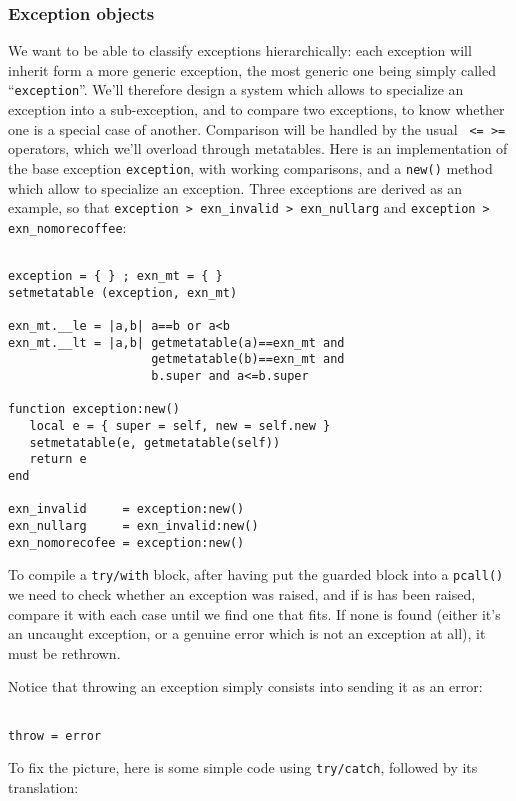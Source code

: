 \subsubsection{Exception objects}
We want to be able to classify exceptions hierarchically: each
exception will inherit form a more generic exception, the most generic
one being simply called ``{\tt exception}''. We'll therefore design a
system which allows to specialize an exception into a sub-exception,
and to compare two exceptions, to know whether one is a special case
of another. Comparison will be handled by the usual {\tt< > <= >=}
operators, which we'll overload through metatables. Here is an
implementation of the base exception {\tt exception}, with working
comparisons, and a {\tt new()} method which allow to specialize an
exception. Three exceptions are derived as an example, so that
{\tt exception > exn\_invalid > exn\_nullarg} and {\tt exception >
  exn\_nomorecoffee}:

\begin{Verbatim}[fontsize=\scriptsize]

exception = { } ; exn_mt = { } 
setmetatable (exception, exn_mt)

exn_mt.__le = |a,b| a==b or a<b 
exn_mt.__lt = |a,b| getmetatable(a)==exn_mt and 
                    getmetatable(b)==exn_mt and
                    b.super and a<=b.super

function exception:new()
   local e = { super = self, new = self.new }
   setmetatable(e, getmetatable(self))
   return e
end

exn_invalid     = exception:new()
exn_nullarg     = exn_invalid:new()
exn_nomorecofee = exception:new()
\end{Verbatim}

To compile a {\tt try/with} block, after having put the guarded block
into a {\tt pcall()} we need to check whether an exception was raised,
and if is has been raised, compare it with each case until we find one
that fits. If none is found (either it's an uncaught exception, or a
genuine error which is not an exception at all), it must be rethrown. 

Notice that throwing an exception simply consists into sending it as
an error:
\begin{Verbatim}[fontsize=\scriptsize]

throw = error
\end{Verbatim}

To fix the picture, here is some simple code using {\tt try/catch},
followed by its translation:

